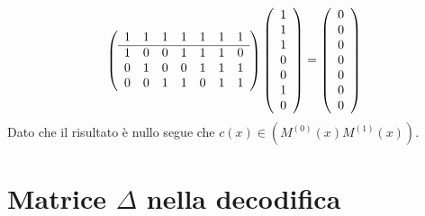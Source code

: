 \begin{esempio}
\begin{align*}
    \left(
    \begin{array} { c c c c c c c c}
    1 & 1 & 1 & 1 & 1 & 1 & 1  \\
    \hline
    1 & 0 & 0 & 1 & 1 & 1 & 0  \\
    0 & 1 & 0 & 0 & 1 & 1 & 1  \\
    0 & 0 & 1 & 1 & 0 & 1 & 1  \\
    \end{array}
    \right)
    \left(
    \begin{array} { c }
    1 \\
    1 \\
    1 \\
    0 \\
    0 \\
    1 \\
    0
    \end{array}
    \right)
    =
    \left(
    \begin{array} { c }
    0 \\
    0 \\
    0 \\
    0 \\
    0 \\
    0 \\
    0
    \end{array}
    \right)
  \end{align*}
  Dato che il risultato è nullo segue che $c(x)\in (M^{(0)}(x)M^{(1)}(x))$.
\end{esempio}




\section{Matrice $\Delta$ nella decodifica}

